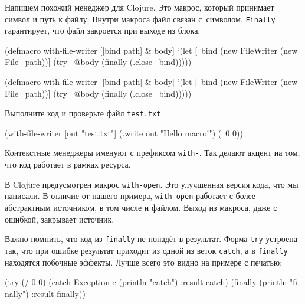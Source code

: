 Напишем похожий менеджер для Clojure. Это макрос, который принимает символ и
путь к файлу. Внутри макроса файл связан с~символом. \verb|Finally|
гарантирует, что файл закроется при выходе из блока.


\ifx\DEVICETYPE\MOBILE

\begin{english}
  \begin{clojure}
(defmacro with-file-writer
  [[bind path] & body]
  `(let [~bind (new FileWriter
                 (new File ~path))]
     (try
       ~@body
       (finally
         (.close ~bind)))))
  \end{clojure}
\end{english}

\else

\begin{english}
  \begin{clojure}
(defmacro with-file-writer
  [[bind path] & body]
  `(let [~bind (new FileWriter (new File ~path))]
     (try
       ~@body
       (finally
         (.close ~bind)))))
  \end{clojure}
\end{english}

\fi

Выполните код и проверьте файл \verb|test.txt|:

\begin{english}
  \begin{clojure}
(with-file-writer [out "test.txt"]
  (.write out "Hello macro!")
  (\ 0 0))
  \end{clojure}
\end{english}

Контекстные менеджеры именуют с префиксом \verb|with-|. Так делают акцент на
том, что код работает в рамках ресурса.


В Clojure предусмотрен макрос \verb|with-open|. Это улучшенная версия кода,
что мы написали. В отличие от нашего примера, \verb|with-open| работает с
более абстрактным источником, в том числе и файлом. Выход из макроса, даже с
ошибкой, закрывает источник.

Важно помнить, что код из \verb|finally| не попадёт в результат. Форма
\verb|try| устроена так, что при ошибке результат приходит из одной из веток
\verb|catch|, а в \verb|finally| находятся побочные эффекты. Лучше всего это
видно на примере с печатью:

\begin{english}
  \begin{clojure}
(try (/ 0 0)
     (catch Exception e
       (println "catch")
       :result-catch)
     (finally
       (println "finally")
       :result-finally))
  \end{clojure}
\end{english}

